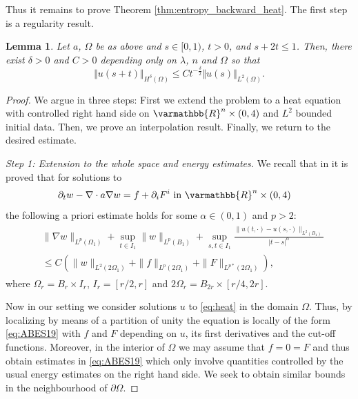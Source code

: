 \documentclass[12pt,twoside]{amsart}
\numberwithin{equation}{section}
\renewcommand{\le}{\leqslant}
\renewcommand{\leq}{\leqslant}
\renewcommand{\mathbb}{\varmathbb}
\newtheorem{lemma}[theorem]{Lemma}
\newcommand {\R} {\mathbb{R}} \newcommand {\Z} {\mathbb{Z}}
\newcommand {\p} {\partial}
\begin{document}
Thus it remains to prove Theorem \ref{thm:entropy_backward_heat}. The first step is a regularity result.

\begin{lemma} 
\label{lem:Sneiberg}
Let $a$, $\Omega$ be as above and $s \in [0,1)$, $t > 0$, and $s+2t \leq 1$.
Then, there exist $\delta>0$ and $C>0$ depending only on $\lambda$, $n$ and $\Omega$ so that 
  \[ \Vert u(s+t) \Vert_{H^\delta(\Omega)} \le C t^{-\frac{\delta}2} \Vert u(s) \Vert_{L^2(\Omega)}. \]
\end{lemma} 




\begin{proof}
We argue in three steps: First we extend the problem to a heat equation with controlled right hand side on $\R^n \times (0,4)$ and $L^2$ bounded initial data. Then, we prove an interpolation result. Finally, we return to the desired estimate.

\emph{Step 1: Extension to the whole space and energy estimates.}
We recall that in \cite[Theorem 8.1]{ABES19} it is proved that for solutions to 
\begin{align}
\label{eq:inhom_eq_heat}
\p_t w - \nabla \cdot a \nabla w &= f + \p_i F^i \mbox{ in } \R^n \times (0,4)
\end{align}
the following a priori estimate holds for some $\alpha \in (0,1)$ and $p>2$:
\begin{align}
\label{eq:ABES19}
\begin{split}
&\|\nabla w\|_{L^p(\Omega_1)} + \sup\limits_{t\in I_1}\|w\|_{L^p(B_1)} + \sup\limits_{s,t\in I_1}\frac{\|u(t,\cdot)-u(s,\cdot)\|_{L^2(B_1)}}{|t-s|^{\alpha}} \\
&\leq C \left( \|w\|_{L^2(2\Omega_{1})} + \|f\|_{L^p(2 \Omega_1)} + \|F \|_{L^{p*}(2\Omega_{1})}\right),
\end{split}
\end{align}
where $\Omega_r = B_r \times I_r $, $I_r = [r/2,r]$ and $2 \Omega_{r} = B_{2r} \times [r/4,2r]$.

Now in our setting we consider solutions $u$ to \eqref{eq:heat} in the domain $\Omega$. Thus, by localizing by means of a partition of unity the equation is locally of the form \eqref{eq:ABES19} with $f$ and $F$ depending on $u$, its first derivatives and the cut-off functions. Moreover, in the interior of $\Omega$ we may assume that $f = 0 =F$ and thus obtain estimates in \eqref{eq:ABES19} which only involve quantities controlled by the usual energy estimates on the right hand side. We seek to obtain similar bounds in the neighbourhood of $\partial \Omega$. 


\end{proof}
\end{document}
